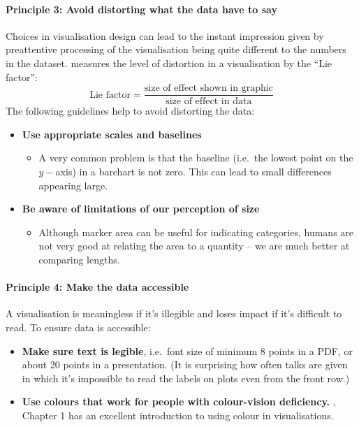 \documentclass[10pt]{article}
\begin{document}
\begin{multicols}{3}
\paragraph{Principle 3: Avoid distorting what the data have to say}

Choices in visualisation design can lead to the instant impression
given by preattentive processing of the visualisation being quite
different to the numbers in the dataset. \citet{Tuft82visu1ed} 
measures the level of distortion in a visualisation by the ``Lie
factor'':
\begin{displaymath}
  \textrm{Lie factor} = \frac{\textrm{size of effect shown in graphic}}{\textrm{size of
  effect in data}}
\end{displaymath}
The following guidelines help to avoid distorting the data:
\begin{itemize}
\item \textbf{Use appropriate scales and baselines}
  \begin{itemize}
  \item A very common problem is that the baseline (i.e.~the lowest
    point on the $y-$axis) in a barchart is not zero. This can lead to
    small differences appearing large.
  \end{itemize}
\item \textbf{Be aware of limitations of our perception of size}
  \begin{itemize}
  \item Although marker area can be useful for indicating categories,
    humans are not very good at relating the area to a quantity -- we
    are much better at comparing lengths.
  \end{itemize}
\end{itemize}


\paragraph{Principle 4:  Make the data accessible}

A visualisation is meaningless if it's illegible and loses impact if
it's difficult to read. To ensure data is accessible:
\begin{itemize}
\item \textbf{Make sure text is legible}, i.e.~font size of minimum 8 points in
  a PDF, or about 20 points in a presentation. (It is surprising how
  often talks are given in which it's impossible to read the labels on
  plots even from the front row.)
\item \textbf{Use colours that work for people with colour-vision deficiency.}
  \citet{WexlEtal17big}, Chapter 1 has an excellent introduction to
  using colour in visualisations.
\end{itemize}



\end{multicols}
\end{document}

